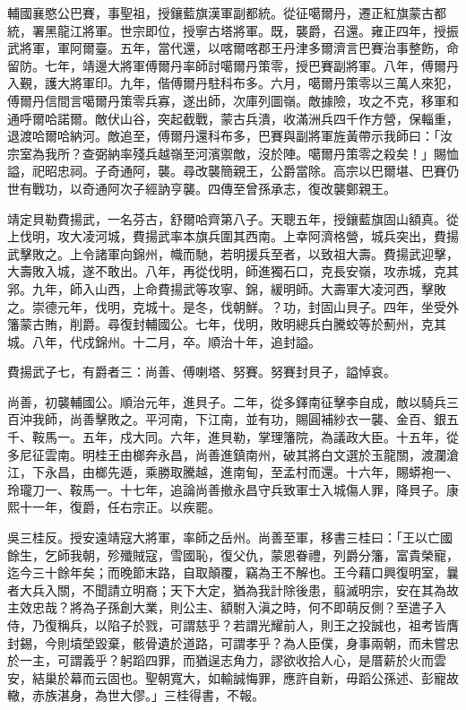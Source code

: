 \begin{pinyinscope}
輔國襄愍公巴賽，事聖祖，授鑲藍旗漢軍副都統。從征噶爾丹，遷正紅旗蒙古都統，署黑龍江將軍。世宗即位，授寧古塔將軍。既，襲爵，召還。雍正四年，授振武將軍，軍阿爾臺。五年，當代還，以喀爾喀郡王丹津多爾濟言巴賽治事整飭，命留防。七年，靖邊大將軍傅爾丹率師討噶爾丹策零，授巴賽副將軍。八年，傅爾丹入覲，護大將軍印。九年，偕傅爾丹駐科布多。六月，噶爾丹策零以三萬人來犯，傅爾丹信間言噶爾丹策零兵寡，遂出師，次庫列圖嶺。敵據險，攻之不克，移軍和通呼爾哈諾爾。敵伏山谷，突起截戰，蒙古兵潰，收滿洲兵四千作方營，保輜重，退渡哈爾哈納河。敵追至，傅爾丹還科布多，巴賽與副將軍旌黃帶示我師曰：「汝宗室為我所？查弼納率殘兵越嶺至河濱禦敵，沒於陣。噶爾丹策零之殺矣！」賜恤謚，祀昭忠祠。子奇通阿，襲。尋改襲簡親王，公爵當除。高宗以巴爾堪、巴賽仍世有戰功，以奇通阿次子經訥亨襲。四傳至曾孫承志，復改襲鄭親王。

靖定貝勒費揚武，一名芬古，舒爾哈齊第八子。天聰五年，授鑲藍旗固山額真。從上伐明，攻大凌河城，費揚武率本旗兵圍其西南。上幸阿濟格營，城兵突出，費揚武擊敗之。上令諸軍向錦州，幟而馳，若明援兵至者，以致祖大壽。費揚武迎擊，大壽敗入城，遂不敢出。八年，再從伐明，師進獨石口，克長安嶺，攻赤城，克其郛。九年，師入山西，上命費揚武等攻寧、錦，緩明師。大壽軍大凌河西，擊敗之。崇德元年，伐明，克城十。是冬，伐朝鮮。？功，封固山貝子。四年，坐受外籓蒙古賄，削爵。尋復封輔國公。七年，伐明，敗明總兵白騰蛟等於薊州，克其城。八年，代戍錦州。十二月，卒。順治十年，追封謚。

費揚武子七，有爵者三：尚善、傅喇塔、努賽。努賽封貝子，謚悼哀。

尚善，初襲輔國公。順治元年，進貝子。二年，從多鐸南征擊李自成，敵以騎兵三百沖我師，尚善擊敗之。平河南，下江南，並有功，賜圓補紗衣一襲、金百、銀五千、鞍馬一。五年，戍大同。六年，進貝勒，掌理籓院，為議政大臣。十五年，從多尼征雲南。明桂王由榔奔永昌，尚善進鎮南州，破其將白文選於玉龍關，渡瀾滄江，下永昌，由榔先遁，乘勝取騰越，進南甸，至孟村而還。十六年，賜蟒袍一、玲瓏刀一、鞍馬一。十七年，追論尚善撤永昌守兵致軍士入城傷人罪，降貝子。康熙十一年，復爵，任右宗正。以疾罷。

吳三桂反。授安遠靖寇大將軍，率師之岳州。尚善至軍，移書三桂曰：「王以亡國餘生，乞師我朝，殄殲賊寇，雪國恥，復父仇，蒙恩眷禮，列爵分籓，富貴榮寵，迄今三十餘年矣；而晚節末路，自取顛覆，竊為王不解也。王今藉口興復明室，曩者大兵入關，不聞請立明裔；天下大定，猶為我計除後患，翦滅明宗，安在其為故主效忠哉？將為子孫創大業，則公主、額駙入滇之時，何不即萌反側？至遣子入侍，乃復稱兵，以陷子於戮，可謂慈乎？若謂光耀前人，則王之投誠也，祖考皆膺封錫，今則墳塋毀棄，骸骨遺於道路，可謂孝乎？為人臣僕，身事兩朝，而未嘗忠於一主，可謂義乎？躬蹈四罪，而猶逞志角力，謬欲收拾人心，是厝薪於火而雲安，結巢於幕而云固也。聖朝寬大，如輸誠悔罪，應許自新，毋蹈公孫述、彭寵故轍，赤族湛身，為世大僇。」三桂得書，不報。


\end{pinyinscope}
